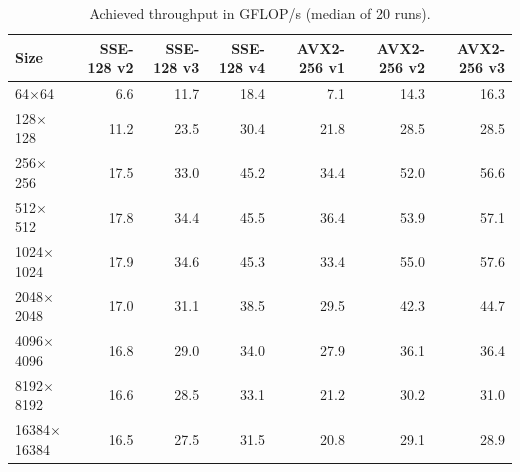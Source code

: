 \begin{table}[htbp]
\centering
\small
\caption{Achieved throughput in GFLOP/s (median of 20 runs).}
\label{tab:simd-gflops}
\begin{tabular}{lrrrrrr}
\toprule
Size & SSE-128 v2 & SSE-128 v3 & SSE-128 v4 & AVX2-256 v1 & AVX2-256 v2 & AVX2-256 v3 \\
\midrule
64$\times$64 & 6.6 & 11.7 & 18.4 & 7.1 & 14.3 & 16.3 \\
128$\times$128 & 11.2 & 23.5 & 30.4 & 21.8 & 28.5 & 28.5 \\
256$\times$256 & 17.5 & 33.0 & 45.2 & 34.4 & 52.0 & 56.6 \\
512$\times$512 & 17.8 & 34.4 & 45.5 & 36.4 & 53.9 & 57.1 \\
1024$\times$1024 & 17.9 & 34.6 & 45.3 & 33.4 & 55.0 & 57.6 \\
2048$\times$2048 & 17.0 & 31.1 & 38.5 & 29.5 & 42.3 & 44.7 \\
4096$\times$4096 & 16.8 & 29.0 & 34.0 & 27.9 & 36.1 & 36.4 \\
8192$\times$8192 & 16.6 & 28.5 & 33.1 & 21.2 & 30.2 & 31.0 \\
16384$\times$16384 & 16.5 & 27.5 & 31.5 & 20.8 & 29.1 & 28.9 \\
\bottomrule
\end{tabular}
\end{table}
